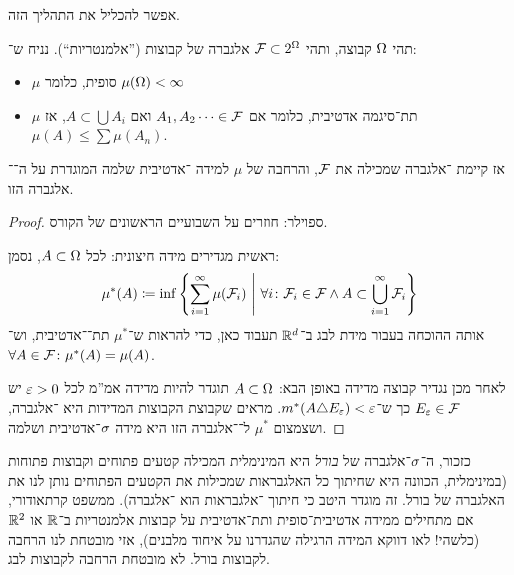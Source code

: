 \documentclass[name=רשימות פונקציות ממשיות – WIP]{../../../tex/classes/noChapterMegasumPreamble}
\begin{document}
	אפשר להכליל את התהליך הזה. 
	
	\begin{Theorem}\label{theo:carathodory}
		תהי $\Omega$ קבוצה, ותהי $\mathcal{F} \subset 2^{\Omega}$ אלגברה של קבוצות (''אלמנטריות``). נניח ש־: 
		\begin{itemize}
			\item $\mu$ סופית, כלומר $\mu(\Omega) < \infty$
			\item $\mu$ תת־סיגמה אדטיבית, כלומר אם $A_1, A_2 \dots \in \mathcal{F}$ ואם $A \subset \bigcup A_i$, אז $\mu(A) \le \sum \mu(A_n)$. 
		\end{itemize}
		אז קיימת \ס־אלגברה שמכילה את $\mathcal{F}$, והרחבה של $\mu$ למידה \ס־אדטיבית שלמה המוגדרת על ה־\ס־אלגברה הזו. 
	\end{Theorem}\begin{proof}
		ספוילר: חוזרים על השבועיים הראשונים של הקורס. 
		
		ראשית מגדירים מידה חיצונית: לכל $A \subset \Omega$, נסמן: 
		\[ \mu^*(A) \coloneqq \inf \left \{ \sum_{i = 1}^{\infty}\mu(\mathcal{F}_i) \ \middle\vert \ \forall i\colon \mathcal{F}_i \in \mathcal{F} \land A \subset \bigcup_{i = 1}^{\infty}\mathcal{F}_i \right \} \]
		אותה ההוכחה בעבור מידת לבג ב־$\mathbb{R}^{d}$ תעבוד כאן, כדי להראות ש־$\mu^*$ תת־\ס־אדטיבית, וש־$\forall A \in \mathcal{F} \colon \mu^*(A) = \mu(A)$. 
		
		לאחר מכן נגדיר קבוצה מדידה באופן הבא: $A \subset \Omega$ תוגדר להיות מדידה אמ''מ לכל $\eg > 0$ יש $E_\eg \in \fc$ כך ש־$m^*(A \trio E_\eg) < \eg$. מראים שקבוצת הקבוצות המדידות היא \ס־אלגברה, ושצמצום $\mu^*$ ל־\ס־אלגברה הזו היא מידה $\sigma$־אדטיבית ושלמה. 
	\end{proof}
	
	
	כזכור, ה־$\sigma$־אלגברה של \textit{בורל} היא המינימלית המכילה קטעים פתוחים וקבוצות פתוחות (במינימלית, הכוונה היא שחיתוך כל ה\ס אלגבראות שמכילות את הקטעים הפתוחים נותן לנו את ה\ס אלגברה של בורל. זה מוגדר היטב כי חיתוך \ס־אלגבראות הוא \ס־אלגברה). ממשפט קרתאודורי, אם מתחילים ממידה אדטיבית־סופית ותת־אדטיבית על קבוצות אלמנטריות ב־$\mathbb{R}$ או $\mathbb{R}^{2}$ (כלשהי! לאו דווקא המידה הרגילה שהגדרנו על איחוד מלבנים), אזי מובטחת לנו הרחבה לקבוצות בורל. לא מובטחת הרחבה לקבוצות לבג. 
	
\end{document}
